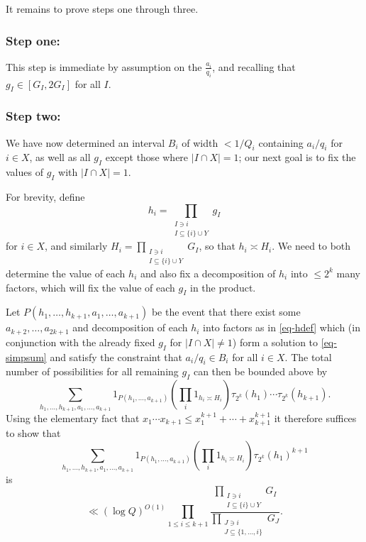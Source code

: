 \documentclass[11pt,letterpaper]{amsart}
\newcommand{\abs}[1]{\left\lvert #1\right\rvert}
\newcommand{\brac}[1]{\left( #1\right)}
\theoremstyle{definition}
\begin{document}
It remains to prove steps one through three.

\subsubsection{Step one:}
This step is immediate by assumption on the $\frac{a_i}{q_i}$, and recalling that $g_I \in [G_I, 2G_I]$ for all $I$.

\subsubsection{Step two:}
We have now determined an interval $B_i$ of width $<1/Q_i$ containing $a_i/q_i$ for $i\in X$, as well as all $g_I$ except those where $\abs{I\cap X}=1$; our next goal is to fix the values of $g_I$ with $\abs{I\cap X}=1$. 

For brevity, define
\begin{equation}\label{eq-hdef}
h_i = \prod_{\substack{I \ni i\\ I\subseteq \{i\} \cup Y}}g_I
\end{equation}
for $i\in X$, and similarly $H_i= \prod_{\substack{I \ni i\\ I\subseteq \{i\} \cup Y}}G_I$, so that $h_i\asymp H_i$. We need to both determine the value of each $h_i$ and also fix a decomposition of $h_i$ into $\leq 2^{k}$ many factors, which will fix the value of each $g_I$ in the product. 

Let $P(h_1,\ldots,h_{k+1},a_1, \dots, a_{k+1})$ be the event that there exist some $a_{k+2}, \ldots, a_{2k+1}$ and decomposition of each $h_i$ into factors as in \eqref{eq-hdef} which (in conjunction with the already fixed $g_I$ for $\abs{I\cap X}\neq 1$) form a solution to \eqref{eq-simpsum} and satisfy the constraint that $a_i/q_i \in B_i$ for all $i \in X$. The total number of possibilities for all remaining $g_I$ can then be bounded above by
\[\sum_{h_1,\ldots,h_{k+1},a_1,\ldots,a_{k+1}}1_{P(h_1,\ldots,a_{k+1})}\brac{\prod_i 1_{h_i \asymp H_i}}\tau_{2^k}(h_1)\cdots \tau_{2^k}(h_{k+1}).\]
Using the elementary fact that $x_1\cdots x_{k+1}\leq x_1^{k+1}+\cdots+x_{k+1}^{k+1}$ it therefore suffices to show that
\begin{equation}\label{eq-hdivsum}
\sum_{h_1,\ldots,h_{k+1},a_1,\ldots,a_{k+1}}1_{P(h_1,\ldots,a_{k+1})}\brac{\prod_i 1_{h_i \asymp H_i}}\tau_{2^k}(h_1)^{k+1}
\end{equation}
is 
\[\ll (\log Q)^{O(1)}\prod_{1\leq i\leq k+1}\frac{\prod_{\substack{I \ni i\\ I\subseteq \{i\}\cup Y}}G_I}{\prod_{\substack{J \ni i\\ J\subseteq \{1,\ldots,i\}}}G_J}.\]
\end{document}
